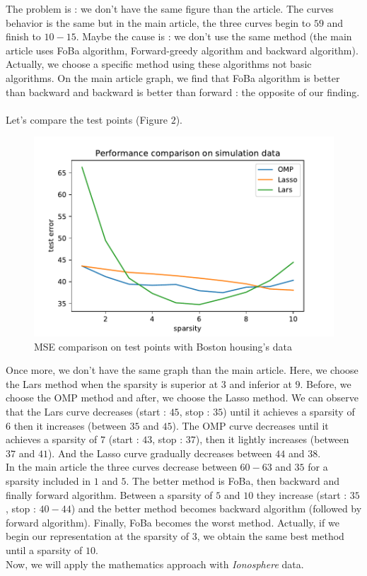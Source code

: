 \documentclass{article}
\begin{document}
The problem is : we don't have the same figure than the article. The curves behavior is the same but in the main article, the three curves begin to $59$ and finish to $10-15$. Maybe the cause is : we don't use the same method (the main article uses FoBa algorithm, Forward-greedy algorithm and backward algorithm). Actually, we choose a specific method using these algorithms not basic algorithms. On the main article graph, we find that FoBa algorithm is better than backward and backward is better than forward : the opposite of our finding.\\
\\
Let's compare the test points (Figure $2$).\\
\begin{figure}[!ht]
    \centering
    \includegraphics[scale=0.5]{./images/test_error_housing.pdf}
    \caption{MSE comparison on test points with Boston housing's data}
    \label{Figure 2}
\end{figure}
Once more, we don't have the same graph than the main article. Here, we choose the Lars method when the sparsity is superior at $3$ and inferior at $9$. Before, we choose the OMP method and after, we choose the Lasso method. We can observe that the Lars curve decreases (start : $45$, stop : $35$) until it achieves a sparsity of $6$ then it increases (between $35$ and $45$). The OMP curve decreases until it achieves a sparsity of $7$ (start : $43$, stop : $37$), then it lightly increases (between $37$ and $41$). And the Lasso curve gradually decreases between $44$ and $38$.\\
In the main article the three curves decrease between $60-63$ and $35$ for a sparsity included in $1$ and $5$. The better method is FoBa, then backward and finally forward algorithm. Between a sparsity of $5$ and $10$ they increase (start : $35$, stop : $40-44$) and the better method becomes backward algorithm (followed by forward algorithm). Finally, FoBa becomes the worst method. Actually, if we begin our representation at the sparsity of $3$, we obtain the same best method until a sparsity of $10$.
\\
Now, we will apply the mathematics approach with \textit{Ionosphere} data.
\end{document}
